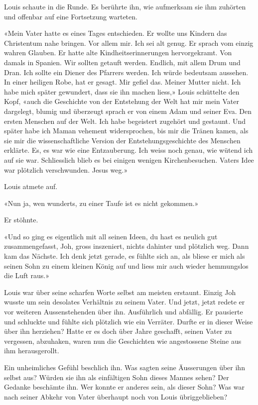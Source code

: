 Louis schaute in die Runde. Es berührte ihn, wie aufmerksam sie ihm
zuhörten und offenbar auf eine Fortsetzung warteten.

«Mein Vater hatte es eines Tages entschieden. Er wollte uns Kindern das
Christentum nahe bringen. Vor allem mir. Ich sei alt genug. Er sprach
vom einzig wahren Glauben. Er hatte alte Kindheitserinnerungen
hervorgekramt. Von damals in Spanien. Wir sollten getauft werden.
Endlich, mit allem Drum und Dran. Ich sollte ein Diener des Pfarrers
werden. Ich würde bedeutsam aussehen. In einer heiligen Robe, hat er
gesagt. Mir gefiel das. Meiner Mutter nicht. Ich habe mich später
gewundert, dass sie ihn machen liess,» Louis schüttelte den Kopf, «auch
die Geschichte von der Entstehung der Welt hat mir mein Vater dargelegt,
blumig und überzeugt sprach er von einem Adam und seiner Eva. Den ersten
Menschen auf der Welt. Ich habe begeistert zugehört und gestaunt\emph{.}
Und später habe ich Maman vehement widersprochen, bis mir die Tränen
kamen, als sie mir die wissenschaftliche Version der
Entstehungsgeschichte des Menschen erklärte. Es, es war wie eine
Entzauberung. Ich weiss noch genau, wie wütend ich auf sie war.
Schliesslich blieb es bei einigen wenigen Kirchenbesuchen. Vaters Idee
war plötzlich verschwunden. Jesus weg.»

Louis atmete auf.

«Nun ja, wen wunderts, zu einer Taufe ist es nicht gekommen.»

Er stöhnte.

«Und so ging es eigentlich mit all seinen Ideen, du hast es neulich gut
zusammengefasst, Joh, gross inszeniert, nichts dahinter und plötzlich
weg. Dann kam das Nächste. Ich denk jetzt gerade, es fühlte sich an, als
bliese er mich als seinen Sohn zu einem kleinen König auf und liess mir
auch wieder hemmungslos die Luft raus.»

Louis war über seine scharfen Worte selbst am meisten erstaunt. Einzig
Joh wusste um sein desolates Verhältnis zu seinem Vater. Und jetzt,
jetzt redete er vor weiteren Aussenstehenden über ihn. Ausführlich und
abfällig. Er pausierte und schluckte und fühlte sich plötzlich wie ein
Verräter. Durfte er in dieser Weise über ihn herziehen? Hatte er es doch
über Jahre geschafft, seinen Vater zu vergessen, abzuhaken, waren nun
die Geschichten wie angestossene Steine aus ihm herausgerollt.

Ein unheimliches Gefühl beschlich ihn. Was sagten seine Äusserungen über
ihn selbst aus? Würden sie ihn als einfältigen Sohn dieses Mannes sehen?
Der Gedanke beschämte ihn. Wer konnte er anderes sein, als dieser Sohn?
Was war nach seiner Abkehr von Vater überhaupt noch von Louis
übriggeblieben?


